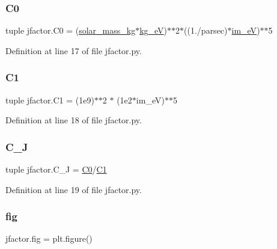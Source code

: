 \subsubsection{\texorpdfstring{C0}{C0}}
{\footnotesize\ttfamily tuple jfactor.\+C0 = (\hyperlink{namespacejfactor_a30f254edbd584a30535a1b98c2916563}{solar\+\_\+mass\+\_\+kg}$\ast$\hyperlink{namespacejfactor_a2881505111ca34d6a84a5b09a5c19a86}{kg\+\_\+eV})$\ast$$\ast$2$\ast$((1./parsec)$\ast$\hyperlink{namespacejfactor_a3d86861d725265dc096b798369902d43}{im\+\_\+eV})$\ast$$\ast$5}



Definition at line 17 of file jfactor.\+py.

\mbox{\label{namespacejfactor_a2c0c80a124f7a32f943f0b9b38f184d4}} 
\subsubsection{\texorpdfstring{C1}{C1}}
{\footnotesize\ttfamily tuple jfactor.\+C1 = (1e9)$\ast$$\ast$2 $\ast$ (1e2$\ast$im\+\_\+e\+V)$\ast$$\ast$5}



Definition at line 18 of file jfactor.\+py.

\mbox{\label{namespacejfactor_aaa482b21aae986b864a5adb04d928dab}} 
\subsubsection{\texorpdfstring{C\+\_\+J}{C\_J}}
{\footnotesize\ttfamily tuple jfactor.\+C\+\_\+J = \hyperlink{namespacejfactor_a69776fb72a257bd354abf1104511a3c7}{C0}/\hyperlink{namespacejfactor_a2c0c80a124f7a32f943f0b9b38f184d4}{C1}}



Definition at line 19 of file jfactor.\+py.

\mbox{\label{namespacejfactor_a543bb58e72396959da8abdb03baad5eb}} 
\subsubsection{\texorpdfstring{fig}{fig}}
{\footnotesize\ttfamily jfactor.\+fig = plt.\+figure()}



